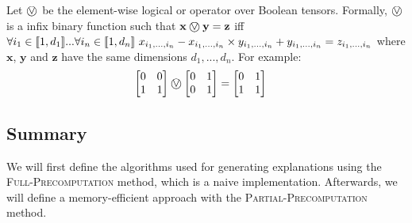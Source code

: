 \begin{definition}
	\label{tensoror}
	
	Let $\incircbin{\lor}$ be the element-wise logical or operator over Boolean tensors. Formally, $\incircbin{\lor}$ is a infix binary function such that $\mathbf{x}\incircbin{\lor}\mathbf{y}=\mathbf{z}$ iff $\forall i_1\in[\![{1,d_1}]\!]...\forall i_n\in[\![{1,d_n}]\!]\ x_{i_1,...,i_n}-x_{i_1,...,i_n}\times y_{i_1,...,i_n}+y_{i_1,...,i_n}=z_{i_1,...,i_n}$ where $\mathbf{x}$, $\mathbf{y}$ and $\mathbf{z}$ have the same dimensions $d_1,...,d_n$.
	\linespace
	For example:
	\begin{align*}
	\begin{bmatrix}
	0&0\\
	1&1\\
	\end{bmatrix}
	\incircbin{\lor}
	\begin{bmatrix}
	0&1\\
	0&1\\
	\end{bmatrix}
	&=
	\begin{bmatrix}
	0&1\\
	1&1\\
	\end{bmatrix}
	\end{align*}
\end{definition}

\subsection{Summary}

We will first define the algorithms used for generating explanations using the \textsc{Full-Precomputation} method, which is a naive implementation. Afterwards, we will define a memory-efficient approach with the \textsc{Partial-Precomputation} method.

